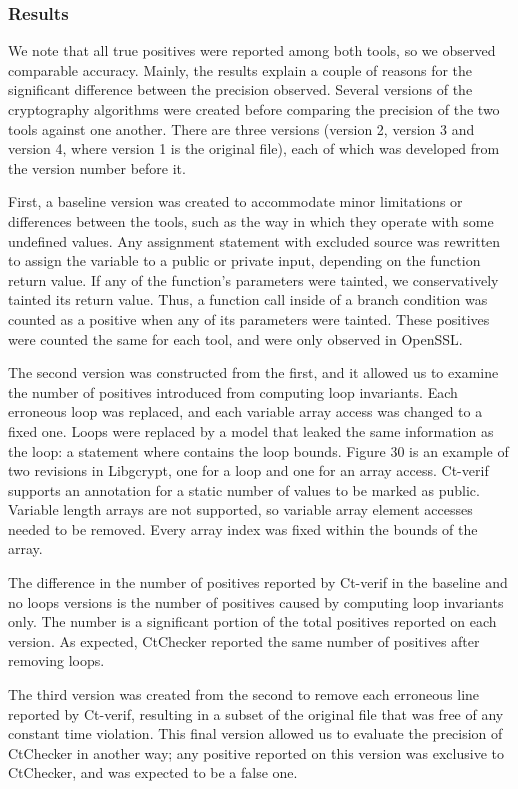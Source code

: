 \subsubsection{Results}
We note that all true positives were reported among both tools, so we
observed comparable accuracy.  Mainly, the results explain a couple of
reasons for the significant difference between the precision observed.
Several versions of the  cryptography algorithms were created before
comparing the precision of the two tools against one another.  There
are three versions (version 2, version 3 and version 4, where version
1 is the original file), each of which was developed from the version
number before it.

First, a baseline version was created to accommodate minor limitations
or differences between the tools, such as the way in which they operate
with some undefined values. Any assignment statement with excluded
source was rewritten to assign the variable to a public or private
input, depending on the function return value. If any of the function’s
parameters were tainted, we conservatively tainted its return value.
Thus, a function call inside of a branch condition was counted as a
positive when any of its parameters were tainted. These positives were
counted the same for each tool, and were only observed in OpenSSL.

The second version was constructed from the first, and it allowed us to
examine the number of positives introduced from computing loop invariants.
Each erroneous loop was replaced, and each variable array access was
changed to a fixed one. Loops were replaced by a model that leaked the
same information as the loop: a  statement where
 contains the loop bounds. Figure 30 is an example of two
revisions in Libgcrypt, one for a loop and one for an array access.
Ct-verif supports an annotation for a static number of values to be
marked as public.  Variable length arrays are not supported, so variable
array element accesses needed to be removed. Every array index was fixed
within the bounds of the array.

The difference in the number of positives reported by Ct-verif in the
baseline and no loops versions is the number of positives caused by
computing loop invariants only.  The number is a significant portion
of the total positives reported on each version. As expected, CtChecker reported the
same number of positives after removing loops.

The third version was created from the second to remove each erroneous
line reported by Ct-verif, resulting in a subset of the original file
that was free of any constant time violation. This final version allowed
us to evaluate the precision of CtChecker in another way; any positive
reported on this version was exclusive to CtChecker, and was expected
to be a false one.

